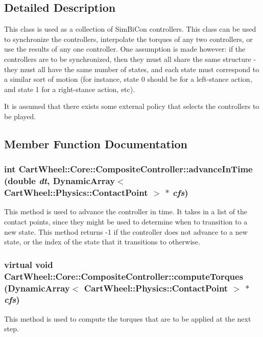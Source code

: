 \subsection{Detailed Description}
This class is used as a collection of SimBiCon controllers. This class can be used to synchronize the controllers, interpolate the torques of any two controllers, or use the results of any one controller. One assumption is made however: if the controllers are to be synchronized, then they must all share the same structure -\/ they must all have the same number of states, and each state must correspond to a similar sort of motion (for instance, state 0 should be for a left-\/stance action, and state 1 for a right-\/stance action, etc).

It is assumed that there exists some external policy that selects the controllers to be played. 

\subsection{Member Function Documentation}
\hypertarget{classCartWheel_1_1Core_1_1CompositeController_a0f8ff764e329d06f72dd2ba756e6aed1}{
\subsubsection[{advanceInTime}]{\setlength{\rightskip}{0pt plus 5cm}int CartWheel::Core::CompositeController::advanceInTime (double {\em dt}, \/  DynamicArray$<$ {\bf CartWheel::Physics::ContactPoint} $>$ $\ast$ {\em cfs})}}
\label{classCartWheel_1_1Core_1_1CompositeController_a0f8ff764e329d06f72dd2ba756e6aed1}
This method is used to advance the controller in time. It takes in a list of the contact points, since they might be used to determine when to transition to a new state. This method returns -\/1 if the controller does not advance to a new state, or the index of the state that it transitions to otherwise. \hypertarget{classCartWheel_1_1Core_1_1CompositeController_a03b84a4f22ace37730af71e63ab765cd}{
\subsubsection[{computeTorques}]{\setlength{\rightskip}{0pt plus 5cm}virtual void CartWheel::Core::CompositeController::computeTorques (DynamicArray$<$ {\bf CartWheel::Physics::ContactPoint} $>$ $\ast$ {\em cfs})}}
\label{classCartWheel_1_1Core_1_1CompositeController_a03b84a4f22ace37730af71e63ab765cd}
This method is used to compute the torques that are to be applied at the next step. 

